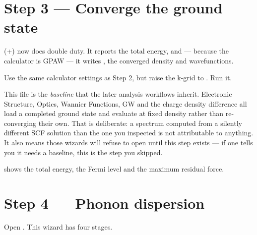 \section{Step 3 --- Converge the ground state}

\menusep{} (+)
now does double duty. It reports the total energy, and --- because the
calculator is GPAW --- it writes , the converged
density and wavefunctions.

Use the same calculator settings as Step 2, but raise the k-grid to
. Run it.

\begin{calnote}
This file is the \emph{baseline} that the later analysis workflows inherit.
Electronic Structure, Optics, Wannier Functions, GW and the charge density difference all
load a completed ground
state and evaluate at fixed density rather than re-converging their own. That
is deliberate: a spectrum computed from a silently different SCF solution than
the one you inspected is not attributable to anything. It also means those
wizards will refuse to open until this step exists --- if one tells you it
needs a baseline, this is the step you skipped.
\end{calnote}

\menusep{} shows the total energy,
the Fermi level and the maximum residual force.

\section{Step 4 --- Phonon dispersion}

Open \menusep{}. This wizard has four stages.

